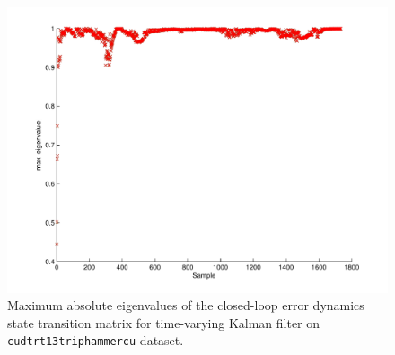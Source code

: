 \begin{figure}[!t]
\includegraphics[width=\columnwidth]{eigenvalues}
\caption{Maximum absolute eigenvalues of the closed-loop error dynamics state transition matrix for time-varying Kalman filter on \texttt{cudtrt13triphammercu} dataset.}
\label{fig:max_eigenvalue}
\end{figure}

